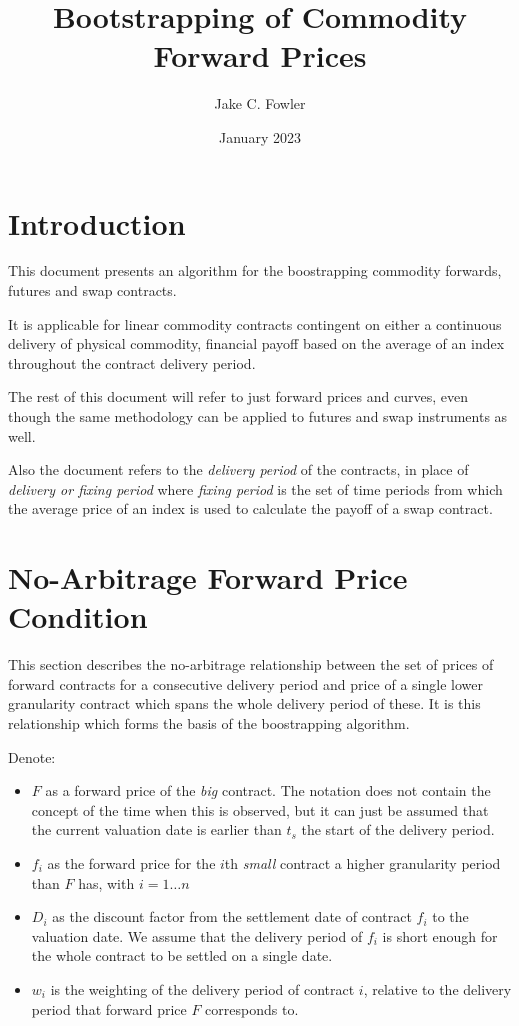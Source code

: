 \documentclass{article}
\title{Bootstrapping of Commodity Forward Prices}
\author{Jake C. Fowler}
\date{January 2023}
\begin{document}
\newcommand{\+}[1]{\ensuremath{\mathbf{#1}}}

\maketitle

\section{Introduction}
This document presents an algorithm for the boostrapping commodity forwards, futures and swap 
contracts. 


It is applicable for linear commodity contracts contingent on either a continuous delivery
of physical commodity, financial payoff based on the average of an index throughout the
contract delivery period. 

The rest of this document will refer to just forward prices and curves, even though the same 
methodology can be applied to futures and swap instruments as well.

Also the document refers to the \emph{delivery period} of the contracts, in place of 
\emph{delivery or fixing period} where \emph{fixing period} is the set of time periods from 
which the average price of an index is used to calculate the payoff of a swap contract.

\section{No-Arbitrage Forward Price Condition}
This section describes the no-arbitrage relationship between the set of prices of forward contracts
for a consecutive delivery period and price of a single lower granularity contract which spans 
the whole delivery period of these. It is this relationship which forms the basis of the boostrapping
algorithm.

Denote:
\begin{itemize}
    \item $F$ as a forward price of the \emph{big} contract.
    The notation does not contain the concept of the
    time when this is observed, but it can just be assumed that the current valuation 
    date is earlier than $t_s$ the start of the delivery period.
    \item $f_i$ as the forward price for the $i$th \emph{small} contract a higher granularity 
    period than $F$ has, with $i=1\dots n$
    \item $D_i$ as the discount factor from the settlement date of contract $f_i$ to the 
    valuation date. We assume that the delivery period of $f_i$ is short enough for 
    the whole contract to be settled on a single date.
    \item $w_i$ is the weighting of the delivery period of contract $i$, relative to
    the delivery period that forward price $F$ corresponds to.
\end{itemize}
\end{document}

